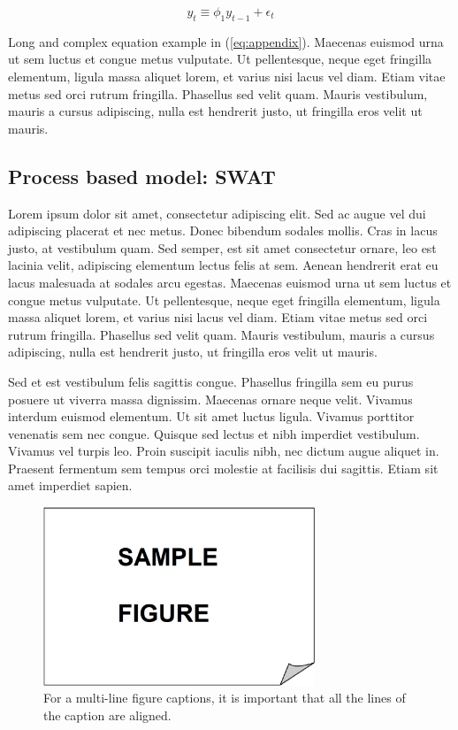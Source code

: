 \begin{equation}
\label{eq:3-1}
   y_{t}  \equiv \phi_{1} y_{t-1} + \epsilon_{t}
\end{equation}

Long and complex equation example in (\ref{eq:appendix}). Maecenas euismod urna ut sem luctus et congue metus vulputate. Ut pellentesque, neque eget fringilla elementum, ligula 
massa aliquet lorem, et varius nisi lacus vel diam. Etiam vitae metus sed orci 
rutrum fringilla. Phasellus sed velit quam. Mauris vestibulum, mauris a cursus 
adipiscing, nulla est hendrerit justo, ut fringilla eros velit ut mauris.

\subsection{Process based model: SWAT}

Lorem ipsum dolor sit amet, consectetur adipiscing elit. Sed ac augue vel dui 
adipiscing placerat et nec metus. Donec bibendum sodales mollis. Cras in lacus 
justo, at vestibulum quam. Sed semper, est sit amet consectetur ornare, leo est 
lacinia velit, adipiscing elementum lectus felis at sem. Aenean hendrerit erat eu 
lacus malesuada at sodales arcu egestas. Maecenas euismod urna ut sem luctus et 
congue metus vulputate. Ut pellentesque, neque eget fringilla elementum, ligula 
massa aliquet lorem, et varius nisi lacus vel diam. Etiam vitae metus sed orci 
rutrum fringilla. Phasellus sed velit quam. Mauris vestibulum, mauris a cursus 
adipiscing, nulla est hendrerit justo, ut fringilla eros velit ut mauris.

Sed et est vestibulum felis sagittis congue. Phasellus fringilla sem eu purus 
posuere ut viverra massa dignissim. Maecenas ornare neque velit. Vivamus interdum 
euismod elementum. Ut sit amet luctus ligula. Vivamus porttitor venenatis sem nec 
congue. Quisque sed lectus et nibh imperdiet vestibulum. Vivamus vel turpis leo. 
Proin suscipit iaculis nibh, nec dictum augue aliquet in. Praesent fermentum sem 
tempus orci molestie at facilisis dui sagittis. Etiam sit amet imperdiet sapien.

\begin{figure}[!ht]
 \centering
 \includegraphics[width=230pt,keepaspectratio=true]{./fig/sekil3}
 \vspace{4mm}
 \caption{For a multi-line figure captions, it is important that all the lines of the caption are aligned.}
 \label{fig:3-1-3}
\end{figure}

